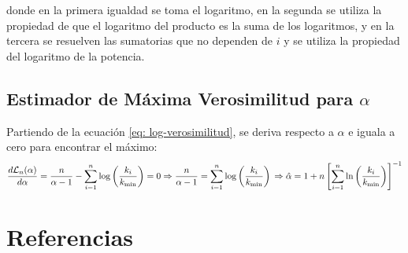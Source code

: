 \documentclass{article}
\begin{document}
donde en la primera igualdad se toma el logaritmo, en la segunda se utiliza la propiedad de que el logaritmo del producto es la suma de los logaritmos, y en la tercera se resuelven las sumatorias que no dependen de $i$ y se utiliza la propiedad del logaritmo de la potencia.

\subsection{Estimador de Máxima Verosimilitud para $\alpha$}

Partiendo de la ecuación \ref{eq: log-verosimilitud}, se deriva respecto a $\alpha$ e iguala a cero para encontrar el máximo:
$$
    \frac{d\mathcal{L}_n(\alpha)}{d\alpha} = \frac{n}{\alpha -1} - \sum_{i=1}^n \log \left(\frac{k_i}{k_\text{min}}\right) = 0 \\
    \Rightarrow \frac{n}{\alpha -1} = \sum_{i=1}^n \log \left(\frac{k_i}{k_\text{min}}\right) \\
    \Rightarrow \hat{\alpha} = 1 + n \left[ \sum_{i=1}^{n} \ln\left(\frac{k_i}{k_\text{min}}\right) \right]^{-1}
$$

\section{Referencias}


\end{document}
